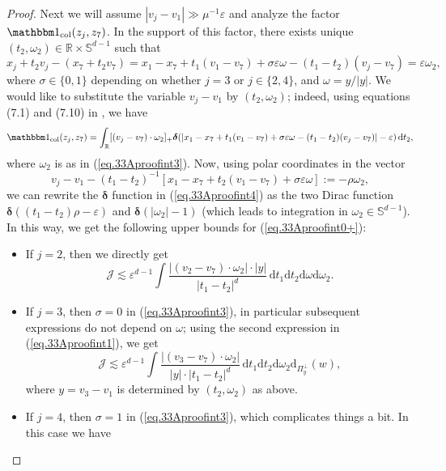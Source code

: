 \documentclass[10pt, reqno]{amsart}
\newcommand{\dirac}{\boldsymbol{\delta}}
\newcommand{\Rb}{\mathbb R}
\newcommand{\Sb}{\mathbb S}
\newcommand {\Jc}{\mathcal J}
\theoremstyle{definition}
\theoremstyle{remark}
\numberwithin{equation}{section}
\begin{document}
\begin{proof}
Next we will assume $|v_j-v_1|\gg \mu^{-1}\varepsilon$ and analyze the factor $\mathbbm 1_{\mathrm{col}}(z_j, z_7)$. In the support of this factor, there exists unique $(t_2, \omega_2)\in \Rb\times \Sb^{d-1}$ such that
\begin{equation}\label{eq.33Aproofint3}
x_j+t_2v_j-(x_7+t_2v_7)=x_1-x_7+t_1(v_1-v_7)+\sigma \varepsilon \omega-(t_1-t_2) (v_j-v_7)=\varepsilon \omega_2,
\end{equation}
where $\sigma\in\{0,1\}$ depending on whether $j=3$ or $j\in\{2,4\}$, and $\omega=y/|y|$. We would like to substitute the variable $v_j-v_1$ by $(t_2,\omega_2)$; indeed, using equations (7.1) and (7.10) in \cite{DHM24}, we have
\begin{equation}\label{eq.33Aproofint4}
\mathbbm 1_{\mathrm{col}}(z_j, z_7)=\int_{\Rb} [(v_j-v_7) \cdot \omega_2]_+ \dirac(|x_1-x_7+t_1(v_1-v_7)+\sigma \varepsilon\omega-(t_1-t_2) (v_j-v_7)|-\varepsilon)\, \mathrm{d}t_2,
\end{equation} where $\omega_2$ is as in (\ref{eq.33Aproofint3}). Now, using polar coordinates in the vector \[v_j-v_1-(t_1-t_2)^{-1}[x_1-x_7+t_2(v_1-v_7)+\sigma \varepsilon\omega]:=-\rho \omega_2,\] we can rewrite the $\dirac$ function in (\ref{eq.33Aproofint4}) as the two Dirac function $\dirac((t_1-t_2)\rho-\varepsilon)$ and $\dirac(|\omega_2|-1)$ (which leads to integration in $\omega_2\in\Sb^{d-1}$). In this way, we get the following upper bounds for (\ref{eq.33Aproofint0+}):
\begin{itemize}
\item If $j=2$, then we directly get \begin{equation}\label{333proofint5}
\Jc\lesssim \varepsilon^{d-1}\int\frac{|(v_2-v_7)\cdot \omega_2|\cdot|y|}{|t_1-t_2|^{d}} \,\mathrm{d}t_1\mathrm{d}t_2 \mathrm{d}\omega\mathrm{d}\omega_2.
\end{equation}
\item If $j=3$, then $\sigma=0$ in (\ref{eq.33Aproofint3}), in particular subsequent expressions do not depend on $\omega$; using the second expression in (\ref{eq.33Aproofint1}), we get
\begin{equation}\label{333proofint5+}
\Jc\lesssim \varepsilon^{d-1}\int\frac{|(v_3-v_7)\cdot \omega_2|}{|y|\cdot|t_1-t_2|^{d}} \,\mathrm{d}t_1\mathrm{d}t_2 \mathrm{d}\omega_2\mathrm{d}_{\Pi_y^\perp}(w),
\end{equation} where $y=v_3-v_1$ is determined by $(t_2,\omega_2)$ as above.
\item If $j=4$, then $\sigma=1$ in (\ref{eq.33Aproofint3}), which complicates things a bit. In this case we have

\end{itemize}
\end{proof}
\end{document}
